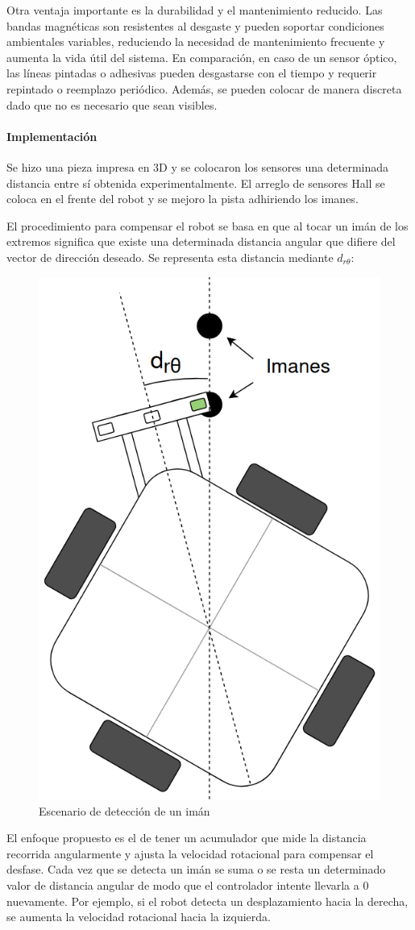 Otra ventaja importante es la durabilidad y el mantenimiento reducido. Las bandas magnéticas son resistentes al desgaste y pueden soportar condiciones ambientales variables, reduciendo la necesidad de mantenimiento frecuente y aumenta la vida útil del sistema. En comparación, en caso de un sensor óptico, las líneas pintadas o adhesivas pueden desgastarse con el tiempo y requerir repintado o reemplazo periódico. Además, se pueden colocar de manera discreta dado que no es necesario que sean visibles.


\paragraph{Implementación} \mbox{} \vspace{8pt}

Se hizo una pieza impresa en 3D y se colocaron los sensores una determinada distancia entre sí obtenida experimentalmente. El arreglo de sensores Hall se coloca en el frente del robot y se mejoro la pista adhiriendo los imanes.

El procedimiento para compensar el robot se basa en que al tocar un imán de los extremos significa que existe una determinada distancia angular que difiere del vector de dirección deseado. Se representa esta distancia mediante $d_{r\theta}$:

\begin{figure}[H]
    \centering
    \includegraphics[width=0.4\linewidth]{images/robot_desplazamiento_angular_toca_iman.png}
    \caption{Escenario de detección de un imán}
    \label{fig:deteccionimanrobot}
\end{figure}

El enfoque propuesto es el de tener un acumulador que mide la distancia recorrida angularmente y ajusta la velocidad rotacional para compensar el desfase. Cada vez que se detecta un imán se suma o se resta un determinado valor de distancia angular de modo que el controlador intente llevarla a 0 nuevamente. Por ejemplo, si el robot detecta un desplazamiento hacia la derecha, se aumenta la velocidad rotacional hacia la izquierda.

